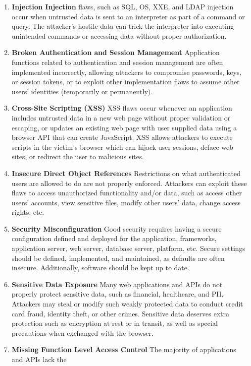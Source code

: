 \documentclass[14pt,a4paper,report]{report}
\begin{document}
\begin{enumerate}
	\item \textbf{Injection Injection} flaws, such as SQL, OS, XXE, and LDAP injection occur when untrusted
	data is sent to an interpreter as part of a command or query. The attacker’s hostile data
	can trick the interpreter into executing unintended commands or accessing data without
	proper authorization.
	\item \textbf{Broken Authentication and Session Management} Application functions related to authentication
	and session management are often implemented incorrectly, allowing attackers
	to compromise passwords, keys, or session tokens, or to exploit other implementation
	flaws to assume other users’ identities (temporarily or permanently).
	\item \textbf{Cross-Site Scripting (XSS)} XSS flaws occur whenever an application includes untrusted
	data in a new web page without proper validation or escaping, or updates an existing
	web page with user supplied data using a browser API that can create JavaScript. XSS
	allows attackers to execute scripts in the victim’s browser which can hijack user sessions,
	deface web sites, or redirect the user to malicious sites.
	\item \textbf{Insecure Direct Object References} Restrictions on what authenticated users are allowed
	to do are not properly enforced. Attackers can exploit these flaws to access unauthorized
	functionality and/or data, such as access other users’ accounts, view sensitive files,
	modify other users’ data, change access rights, etc.
	\item \textbf{Security Misconfiguration} Good security requires having a secure configuration defined
	and deployed for the application, frameworks, application server, web server, database
	server, platform, etc. Secure settings should be defined, implemented, and maintained,
	as defaults are often insecure. Additionally, software should be kept up to date.
	\item \textbf{Sensitive Data Exposure} Many web applications and APIs do not properly protect sensitive
	data, such as financial, healthcare, and PII. Attackers may steal or modify such
	weakly protected data to conduct credit card fraud, identity theft, or other crimes. Sensitive
	data deserves extra protection such as encryption at rest or in transit, as well as
	special precautions when exchanged with the browser.
	\item \textbf{Missing Function Level Access Control} The majority of applications and APIs lack the

\end{enumerate}
\end{document}
